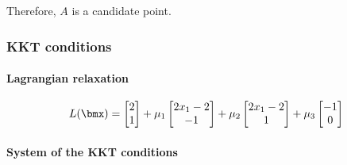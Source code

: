 \documentclass[\main/main.tex]{subfiles}
\begin{document}
Therefore, $A$ is a candidate point.

\subsubsection*{KKT conditions}

\paragraph*{Lagrangian relaxation}

\[
  L(\bmx) = \begin{bmatrix}
    2 \\
    1
  \end{bmatrix} + \mu_1 \begin{bmatrix}
    2x_1 -2 \\
    -1
  \end{bmatrix} + \mu_2 \begin{bmatrix}
    2x_1 -2 \\
    1
  \end{bmatrix} + \mu_3 \begin{bmatrix}
    -1 \\
    0
  \end{bmatrix}
\]

\paragraph*{System of the KKT conditions}
\end{document}
